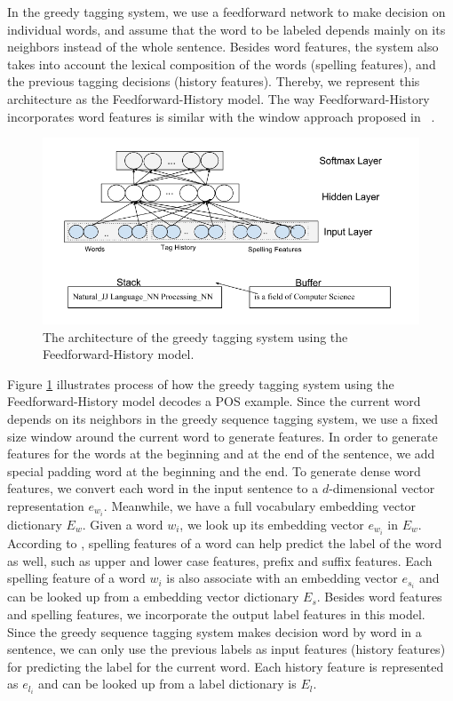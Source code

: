 \documentclass{sfuthesis}
\begin{document}
In the greedy tagging system, we use a feedforward network to make decision on individual words, and assume that the word to be labeled depends mainly on its neighbors instead of the whole sentence. Besides word features, the system also takes into account the lexical composition of the words (spelling features), and the previous tagging decisions (history features). Thereby, we represent this architecture as the Feedforward-History model. The way Feedforward-History incorporates word features is similar with the window approach proposed in ~\cite{collobert2011natural}.

\begin{figure}
  \centering
  \includegraphics[scale=0.6]{greedypos.png}
 \caption{The architecture of the greedy tagging system using the Feedforward-History model.}
  \label{fig:greedypos}
\end{figure}

Figure \ref{fig:greedypos} illustrates process of how the greedy tagging system using the Feedforward-History model decodes a POS example. Since the current word depends on its neighbors in the greedy sequence tagging system, we use a fixed size window around the current word to generate features. In order to generate features for the words at the beginning and at the end of the sentence, we add special padding word at the beginning and the end. To generate dense word features, we convert each word in the input sentence to a $d$-dimensional vector representation $e_{w_{i}}$. Meanwhile, we have a full vocabulary embedding vector dictionary $E_{w}$. Given a word $w_{i}$, we look up its embedding vector $e_{w_{i}}$ in $E_{w}$. According to \cite{ratnaparkhi1996maximum}, spelling features of a word can help predict the label of the word as well, such as upper and lower case features, prefix and suffix features. Each spelling feature of a word $w_{i}$ is also associate with an embedding vector $e_{s_{i}}$ and can be looked up from a embedding vector dictionary $E_{s}$. Besides word features and spelling features, we incorporate the output label features in this model. Since the greedy sequence tagging system makes decision word by word in a sentence, we can only use the previous labels as input features (history features) for predicting the label for the current word. Each history feature is represented as $e_{l_{i}}$ and can be looked up from a label dictionary is $E_{l}$.
\end{document}
